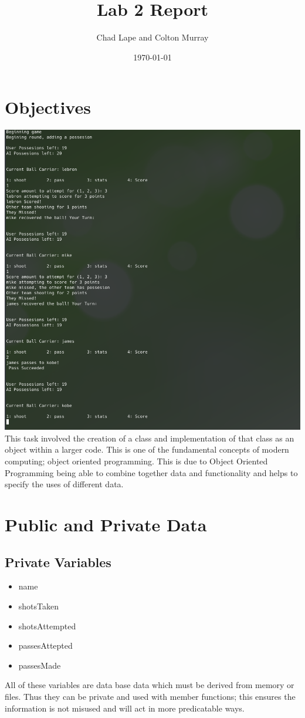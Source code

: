 \documentclass[11pt]{article}
\author{Chad Lape and Colton Murray}
\title{Lab 2 Report}
\date{\today}
\begin{document}
\maketitle

\section{Objectives}
\includegraphics[scale=0.5]{pic.png}\\
This task involved the creation of a class and implementation of that class as an object within a larger code. This is one of the fundamental concepts of modern computing; object oriented programming. This is due to Object Oriented Programming being able to combine together data and functionality and helps to specify the uses of different data. 

\section{Public and Private Data}
\subsection{Private Variables}
\begin{itemize}
\item name
\item shotsTaken
\item shotsAttempted
\item passesAttepted
\item passesMade
\end{itemize}
All of these variables are data base data which must be derived from memory or files. Thus they can be private and used with member functions; this ensures the information is not misused and will act in more predicatable ways.
\end{document}
